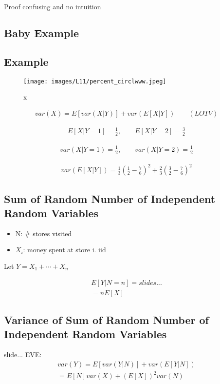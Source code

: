 Proof confusing and no intuition



\subsection{Baby Example}


\subsection{Example}

\begin{figure}[h]
\centering
\texttt{[image: images/L11/percent\_circlwww.jpeg]}
\caption{x}
\end{figure}

\begin{align*}
var(X) = E[var(X|Y)] + var(E[X|Y]) \qquad (LOTV)
\end{align*}

\begin{align*}
E[X|Y=1] = \frac{1}{2}, \qquad E[X|Y=2] = \frac{3}{2}
\end{align*}

\begin{align*}
var(X|Y=1) = \frac{1}{2}, \qquad var(X|Y=2) = \frac{1}{2}
\end{align*}

\begin{align*}
var(E[X|Y]) = \frac{1}{3} \left(\frac{1}{2} - \frac{7}{6} \right)^2 + \frac{2}{3} \left( \frac{3}{2} - \frac{7}{6} \right)^2
\end{align*}

\subsection{Sum of Random Number of Independent Random Variables}


\begin{itemize}
    \item N: \# stores visited
    \item $X_i$: money spent at store i. iid
\end{itemize}


Let $Y=X_1+ \cdots + X_n$

\begin{align*}
    E[Y|N=n] = slides...\\
    = nE[X]
\end{align*}

\subsection{Variance of Sum of Random Number of Independent Random Variables}


slide...
EVE:
\begin{align*}
var(Y) = E[var(Y|N)] + var(E[Y|N])\\
 = E[N] var(X) + (E[X])^2 var(N)
\end{align*}